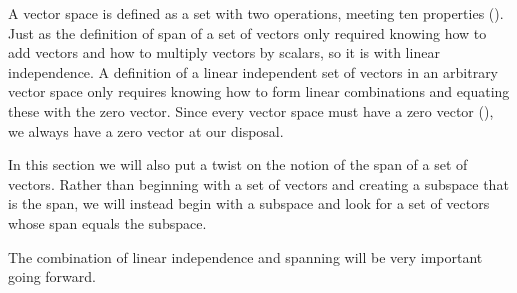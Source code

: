 %
\begin{introduction}
\begin{para}A vector space is defined as a set with two operations, meeting ten properties ().  Just as the definition of span of a set of vectors only required knowing how to add vectors and how to multiply vectors by scalars, so it is with linear independence.  A definition of a linear independent set of vectors in an arbitrary vector space only requires knowing how to form linear combinations and equating these with the zero vector.  Since every vector space must have a zero vector (), we always have a zero vector at our disposal.\end{para}
%
\begin{para}In this section we will also put a twist on the notion of the span of a set of vectors.  Rather than beginning with a set of vectors and creating a subspace that is the span, we will instead begin with a subspace and look for a set of vectors whose span equals the subspace.\end{para}
%
\begin{para}The combination of linear independence and spanning will be very important going forward.
\end{para}
\end{introduction}
%
